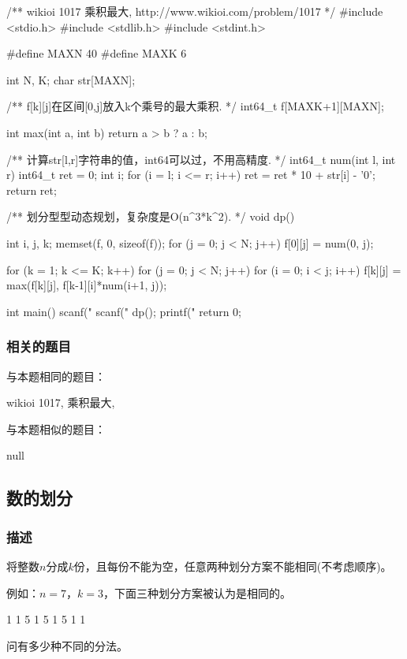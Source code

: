 \begin{Codex}[label=maximal_product.c]
/** wikioi 1017 乘积最大, http://www.wikioi.com/problem/1017 */
#include <stdio.h>
#include <stdlib.h>
#include <stdint.h>

#define MAXN 40
#define MAXK 6

int N, K;
char str[MAXN];

/** f[k][j]在区间[0,j]放入k个乘号的最大乘积. */
int64_t f[MAXK+1][MAXN];


int max(int a, int b) {
    return a > b ? a : b;
}

/** 计算str[l,r]字符串的值，int64可以过，不用高精度. */
int64_t num(int l, int r) {
    int64_t ret = 0;
    int i;
    for (i = l; i <= r; i++) {
        ret = ret * 10 + str[i] - '0';
    }
    return ret;
}

/** 划分型型动态规划，复杂度是O(n^3*k^2). */
void dp() {
    int i, j, k;
    memset(f, 0, sizeof(f));
    for (j = 0; j < N; j++) {
        f[0][j] = num(0, j);
    }

    for (k = 1; k <= K; k++) {
        for (j = 0; j < N; j++) {
            for (i = 0; i < j; i++) {
                f[k][j] = max(f[k][j], f[k-1][i]*num(i+1, j));
            }
        }
    }
}

int main() {
    scanf("%
    scanf("%
    dp();
    printf("%
    return 0;
}
\end{Codex}

\subsubsection{相关的题目}
与本题相同的题目：
\begindot
\item wikioi 1017, 乘积最大, 
\myenddot

与本题相似的题目：
\begindot
\item  null
\myenddot


\subsection{数的划分}

\subsubsection{描述}
将整数$n$分成$k$份，且每份不能为空，任意两种划分方案不能相同(不考虑顺序)。

例如：$n=7$，$k=3$，下面三种划分方案被认为是相同的。
\begin{Code}
1 1 5
1 5 1
5 1 1
\end{Code}
问有多少种不同的分法。

